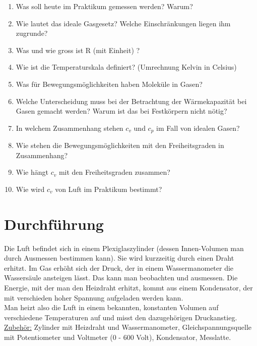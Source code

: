 \begin{enumerate}
 \item Was soll heute im Praktikum gemessen werden? Warum?
 \item Wie lautet das ideale Gasgesetz? Welche Einschränkungen liegen ihm zugrunde?
 \item Was und wie gross ist R (mit Einheit) ?
 \item Wie ist die Temperaturskala definiert? (Umrechnung Kelvin in Celsius)
 \item Was für Bewegungsmöglichkeiten haben Moleküle in Gasen?
 \item Welche Unterscheidung muss bei der Betrachtung der Wärmekapazität bei Gasen gemacht werden? Warum ist das bei Festkörpern nicht nötig?
 \item In welchem Zusammenhang stehen $c_v$ und $c_p$ im Fall von idealen Gasen?
 \item Wie stehen die Bewegungsmöglichkeiten mit den Freiheitsgraden in Zusammenhang?
 \item Wie hängt $c_v$ mit den Freiheitsgraden zusammen?
 \item Wie wird $c_v$ von Luft im Praktikum bestimmt?
\end{enumerate}

\section{Durchführung} 

Die Luft befindet sich in einem Plexiglaszylinder (dessen Innen-Volumen man durch Ausmessen bestimmen kann). Sie wird kurzzeitig durch einen Draht erhitzt. Im Gas erhöht sich der Druck, der in einem Wassermanometer die Wassersäule ansteigen lässt. Das kann man beobachten und ausmessen. Die Energie, mit der man den Heizdraht erhitzt, kommt aus einem Kondensator, der mit verschieden hoher Spannung aufgeladen werden kann.\\
Man heizt also die Luft in einem bekannten, konstanten Volumen auf verschiedene Temperaturen auf und misst den dazugehörigen Druckanstieg.\\

\underline{Zubehör:} Zylinder mit Heizdraht und Wassermanometer, Gleichspannungsquelle mit Potentiometer und Voltmeter (0 - 600 Volt), Kondensator, Messlatte.

